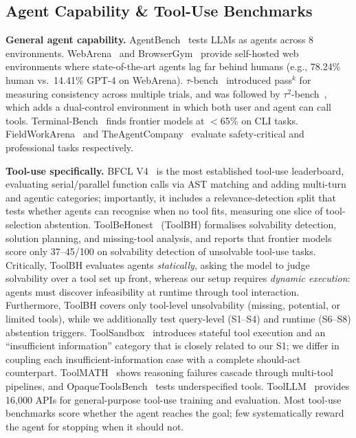 \subsection{Agent Capability \& Tool-Use Benchmarks}

\textbf{General agent capability.}
AgentBench~\citep{liu2025agentbench} tests LLMs as agents across 8 environments. WebArena~\citep{zhou2024webarena} and BrowserGym~\citep{dechezelles2025browsergymecosystemwebagent} provide self-hosted web environments where state-of-the-art agents lag far behind humans (e.g., 78.24\% human vs.\ 14.41\% GPT-4 on WebArena). $\tau$-bench~\citep{yao2024taubench} introduced pass$^k$ for measuring consistency across multiple trials, and was followed by $\tau^2$-bench~\citep{barres2025tau2bench}, which adds a dual-control environment in which both user and agent can call tools. Terminal-Bench~\citep{merrill2026terminalbenchbenchmarkingagentshard} finds frontier models at $<$65\% on CLI tasks. FieldWorkArena~\citep{moteki2025fieldworkarena} and TheAgentCompany~\citep{xu2025theagentcompanybench} evaluate safety-critical and professional tasks respectively. 

\textbf{Tool-use specifically.}
BFCL V4~\citep{patil2025bfcl} is the most established tool-use leaderboard, evaluating serial/parallel function calls via AST matching and adding multi-turn and agentic categories; importantly, it includes a relevance-detection split that tests whether agents can recognise when no tool fits, measuring one slice of tool-selection abstention. ToolBeHonest~\citep{zhang2024toolbehonest} (ToolBH) formalises solvability detection, solution planning, and missing-tool analysis, and reports that frontier models score only 37--45/100 on solvability detection of unsolvable tool-use tasks. Critically, ToolBH evaluates agents \emph{statically}, asking the model to judge solvability over a tool set up front, whereas our setup requires \emph{dynamic execution}: agents must discover infeasibility at runtime through tool interaction. Furthermore, ToolBH covers only tool-level unsolvability (missing, potential, or limited tools), while we additionally test query-level (S1--S4) and runtime (S6--S8) abstention triggers. ToolSandbox~\citep{lu2025toolsandboxstatefulconversationalinteractive} introduces stateful tool execution and an ``insufficient information'' category that is closely related to our S1; we differ in coupling each insufficient-information case with a complete should-act counterpart. ToolMATH~\citep{choi2026toolmath} shows reasoning failures cascade through multi-tool pipelines, and OpaqueToolsBench~\citep{hallinan2026opaquetoolsbench} tests underspecified tools. ToolLLM~\citep{qin2023toolllm} provides 16,000 APIs for general-purpose tool-use training and evaluation. Most tool-use benchmarks score whether the agent reaches the goal; few systematically reward the agent for stopping when it should not.

